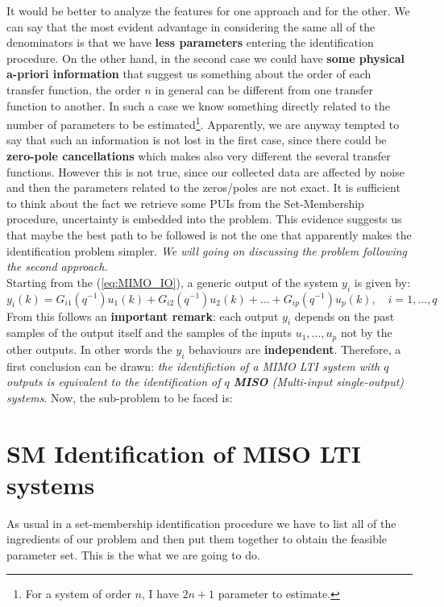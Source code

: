 \noindent
It would be better to analyze the features for one approach and for the other. We can say that the most evident advantage in considering the same all of the denominators is that we have \textbf{less parameters} entering the identification procedure. On the other hand, in the second case we could have \textbf{some physical a-priori information} that suggest us something about the order of each transfer function, the order $n$ in general can be different from one transfer function to another. In such a case we know something directly related to the number of parameters to be estimated\footnote{
    For a system of order $n$, I have $2n+1$ parameter to estimate.
}. Apparently, we are anyway tempted to say that such an information is not lost in the first case, since there could be \textbf{zero-pole cancellations} which makes also very different the several transfer functions. However this is not true, since our collected data are affected by noise and then the parameters related to the zeros/poles are not exact. It is sufficient to think about the fact we retrieve some PUIs from the Set-Membership procedure, uncertainty is embedded into the problem. This evidence suggests us that maybe the best path to be followed is not the one that apparently makes the identification problem simpler. \textit{We will going on discussing the problem following the second approach.}\\

\noindent
Starting from the (\ref{eq:MIMO_IO}), a generic output of the system $y_i$ is given by:
\begin{equation}
    y_i(k)=G_{i1}(q^{-1})u_1(k)+G_{i2}(q^{-1})u_2(k)+\dots+G_{ip}(q^{-1})u_p(k), \quad i=1,...,q
\end{equation}
From this follows an \textbf{important remark}: each output $y_i$ depends on the past samples of the output itself and the samples of the inputs $u_1,...,u_p$ not by the other outputs. In other words the $y_i$ behaviours are \textbf{independent}. Therefore, a first conclusion can be drawn: \textit{the identifiction of a MIMO LTI system with $q$ outputs is equivalent to the identification of $q$ \textbf{MISO} (Multi-input single-output) systems}. Now, the sub-problem to be faced is:

\section{SM Identification of MISO LTI systems}
As usual in a set-membership identification procedure we have to list all of the ingredients of our problem and then put them together to obtain the feasible parameter set. This is the what we are going to do.

